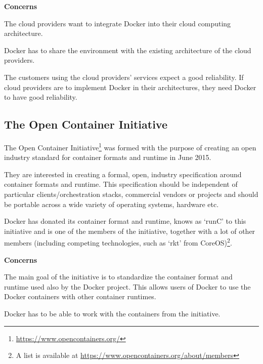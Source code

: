 \textbf{Concerns}
\begin{description}[labelindent=25pt,style=multiline,leftmargin=4.0cm,font=\normalfont\itshape]

\item[\textbf{Portability}: (Installability)] The cloud providers want to integrate Docker into their cloud computing architecture.\\ 

\item[\textbf{Compatibility}: (Co-Existence)] Docker has to share the environment with the existing architecture of the cloud providers.

\item[\textbf{Reliability}] The customers using the cloud providers' services expect a good reliability. If cloud providers are to implement Docker in their architectures, they need Docker to have good reliability.

\end{description}



\subsection*{The Open Container Initiative}

The Open Container Initiative\footnote{\url{https://www.opencontainers.org/}} was formed with the purpose of creating an open industry standard for container formats and runtime in June 2015.

They are interested in creating a formal, open, industry specification around container formats and runtime. This specification should be independent of particular clients/orchestration stacks, commercial vendors or projects and should be portable across a wide variety of operating systems, hardware etc.

Docker has donated its container format and runtime, knows as `runC' to this initiative and is one of the members of the initiative, together with a lot of other members (including competing technologies, such as `rkt' from CoreOS)\footnote{A list is available at \url{https://www.opencontainers.org/about/members}}.

\textbf{Concerns}
\begin{description}[labelindent=25pt,style=multiline,leftmargin=4.0cm,font=\normalfont\itshape]

\item[\textbf{Portability}] The main goal of the initiative is to standardize the container format and runtime used also by the Docker project. This allows users of Docker to use the Docker containers with other container runtimes.

\item[\textbf{Compatibility}: (Interoperability)] Docker has to be able to work with the containers from the initiative.

\end{description}

